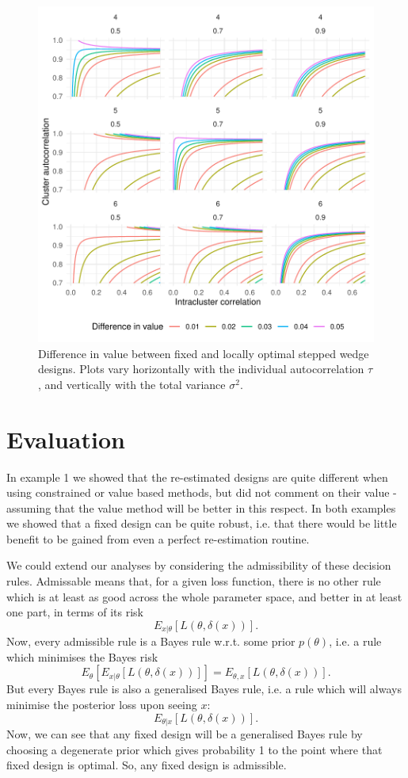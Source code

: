 \documentclass[sagev, Crown]{sagej}
\begin{document}
\begin{figure}
\centering
\includegraphics[scale=0.8]{./figures/fixed_sw_k}
\caption{Difference in value between fixed and locally optimal stepped wedge designs. Plots vary horizontally with the individual autocorrelation $\tau$, and vertically with the total variance $\sigma^2$.}
\label{fig:fixed_sw}
\end{figure}

\section{Evaluation}

In example 1 we showed that the re-estimated designs are quite different when using constrained or value based methods, but did not comment on their value - assuming that the value method will be better in this respect. In both examples we showed that a fixed design can be quite robust, i.e. that there would be little benefit to be gained from even a perfect re-estimation routine. 

We could extend our analyses by considering the admissibility of these decision rules. Admissable means that, for a given loss function, there is no other rule which is at least as good across the whole parameter space, and better in at least one part, in terms of its risk
$$
E_{x | \theta}[L(\theta, \delta(x))].
$$
Now, every admissible rule is a Bayes rule w.r.t. some prior $p(\theta)$, i.e. a rule which minimises the Bayes risk
$$
E_{\theta}[ E_{x | \theta}[L(\theta, \delta(x))] ] = E_{\theta, x}[L(\theta, \delta(x))].
$$
But every Bayes rule is also a generalised Bayes rule, i.e. a rule which will always minimise the posterior loss upon seeing $x$:
$$
E_{\theta | x} [L(\theta, \delta(x))].
$$
Now, we can see that any fixed design will be a generalised Bayes rule by choosing a degenerate prior which gives probability 1 to the point where that fixed design is optimal. So, any fixed design is admissible. 
\end{document}
